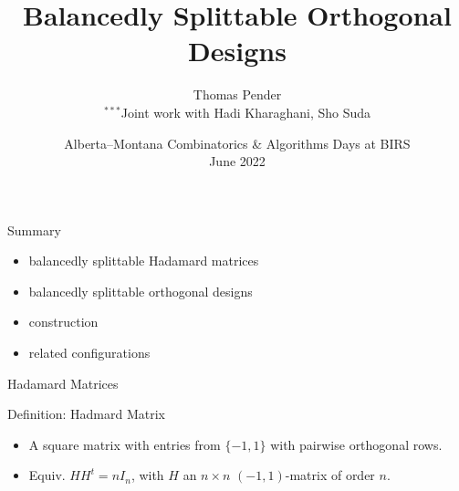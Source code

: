\documentclass{beamer}
\title[Splittable ODs]{Balancedly Splittable Orthogonal Designs}
\author[T. Pender]{Thomas Pender\\\scriptsize $^{***}$Joint work with Hadi Kharaghani, Sho Suda}
\institute[U of L]{Department of Mathematics and Computer Science\\University of
Lethbridge}
\date[BIRS June 2022]{Alberta--Montana Combinatorics \& Algorithms Days at BIRS\\June 2022}
\begin{document}

{
\begin{frame}
  \titlepage
\end{frame}
}

\begin{frame}{Summary}

  \begin{itemize}
    \item balancedly splittable Hadamard matrices
    \item balancedly splittable orthogonal designs
    \item construction
    \item related configurations
  \end{itemize}
  
\end{frame}


\begin{frame}{Hadamard Matrices}

  \begin{block}{Definition: Hadmard Matrix}
    \begin{itemize}
      \item A square matrix with entries from $\{-1,1\}$ with pairwise
        orthogonal rows.
      \item Equiv. $HH^t = nI_n$, with $H$ an $n \times n$ $(-1,1)$-matrix of
        order $n$.
    \end{itemize}
  \end{block}

\end{frame}
\end{document}
